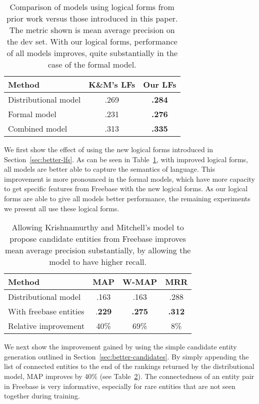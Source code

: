 \documentclass[11pt]{article}
\newcommand{\secref}[1]{Section~\ref{sec:#1}}
\newcommand{\tabref}[1]{Table~\ref{tab:#1}}
\begin{document}
\begin{table}
  \centering
  {\small
    \begin{tabular}{lcc}
      \toprule
      Method & K\&M's LFs & Our LFs \\
      \midrule
      Distributional model & .269 & \textbf{.284} \\
      \midrule
      Formal model & .231 & \textbf{.276} \\
      \midrule
      Combined model & .313 & \textbf{.335} \\
      \bottomrule
    \end{tabular}
  }
  \caption{Comparison of models using logical forms from prior work
  versus those introduced in this paper.  The metric shown is mean
  average precision on the dev set.  With our logical forms,
  performance of all models improves, quite substantially in the case
  of the formal model.}
  \label{tab:better-lfs}
\end{table}

We first show the effect of using the new logical forms introduced in
\secref{better-lfs}.  As can be seen in \tabref{better-lfs}, with
improved logical forms, all models are better able to capture the
semantics of language.  This improvement is more pronounced in the
formal models, which have more capacity to get specific features from
Freebase with the new logical forms.  As our logical forms are able to
give all models better performance, the remaining experiments we
present all use these logical forms.

\begin{table}
  \centering
  {\small
    \begin{tabular}{lccc}
      \toprule
      Method & MAP & W-MAP & MRR \\
      \midrule
      Distributional model & .163 & .163 & .288 \\
      \midrule
      With freebase entities & .\textbf{229} & \textbf{.275} & \textbf{.312} \\
      \midrule
      \midrule
      Relative improvement & 40\% & 69\% & 8\% \\
      \bottomrule
    \end{tabular}
  }
  \caption{Allowing Krishnamurthy and Mitchell's model to propose
  candidate entities from Freebase improves mean average precision
  substantially, by allowing the model to have higher recall.}
  \label{tab:better-candidates}
\end{table}

We next show the improvement gained by using the simple candidate
entity generation outlined in \secref{better-candidates}.  By simply
appending the list of connected entities to the end of the rankings
returned by the distributional model, MAP improves by 40\% (see
\tabref{better-candidates}).  The connectedness of an entity pair in
Freebase is very informative, especially for rare entities that are
not seen together during training.
\end{document}
